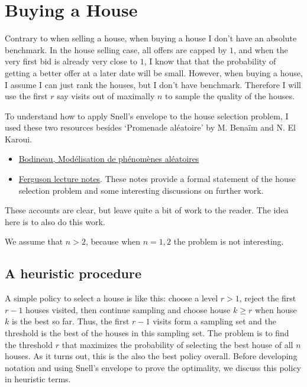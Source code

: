 \documentclass[a4paper]{article}
\begin{document}
\section{Buying a House}
\label{sec:org4c4449f}

Contrary to when selling a house, when buying a house I don't have an absolute benchmark.
In the house selling case, all offers are capped by \(1\), and when the very first bid is already very close to \(1\), I know that that the probability of getting a better offer at a later date will be small.
However, when buying a house, I assume I can just rank the houses, but I don't have benchmark.
Therefore I will use the first \(r\) say visits out of maximally \(n\) to sample the quality of the houses.

To understand how to apply Snell's envelope to the house selection problem, I used these two  resources besides `Promenade aléatoire' by M. Benaïm and N. El Karoui.
\begin{itemize}
\item \href{https://www.ihes.fr/\~bodineau/docs/MAP432.pdf}{Bodineau, Modélisation de phénomènes aléatoires}
\item \href{https://www.math.ucla.edu/\~tom/Stopping/sr2.pdf}{Ferguson lecture notes}. These notes provide a formal statement of the house selection problem and some interesting discussions on further work.
\end{itemize}
These accounts are clear, but leave quite a bit of work to the reader. The idea here is to also do this work.

We assume that \(n > 2\), because when \(n=1,2\) the problem is not interesting.
\subsection{A heuristic procedure}
\label{sec:org972b91f}

A simple policy to select a house is like this: choose a level \(r>1\), reject the first \(r-1\) houses visited, then continue sampling and choose house \(k \geq r\) when house \(k\) is the best so far.
Thus, the first \(r-1\) visits form a sampling set and the threshold is the best of the houses in this sampling set.
The problem is to find the threshold \(r\) that maximizes the probability of selecting the best house of all \(n\) houses.
As it turns out, this is the also the best policy overall.
Before developing notation and using Snell's envelope to prove the optimality, we discuss this policy in heuristic terms.
\end{document}
